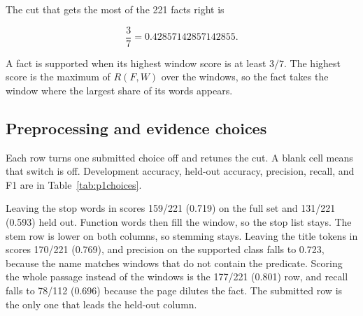 The cut that gets the most of the 221 facts right is

\[
\frac{3}{7} = 0.42857142857142855.
\]

A fact is supported when its highest window score is at least \(3/7\). The highest score is the maximum of \(R(F,W)\) over the windows, so the fact takes the window where the largest share of its words appears.

\subsection{Preprocessing and evidence choices}

Each row turns one submitted choice off and retunes the cut. A blank cell means that switch is off. Development accuracy, held-out accuracy, precision, recall, and F1 are in Table~\ref{tab:p1choices}.

Leaving the stop words in scores 159/221 (0.719) on the full set and 131/221 (0.593) held out. Function words then fill the window, so the stop list stays. The stem row is lower on both columns, so stemming stays. Leaving the title tokens in scores 170/221 (0.769), and precision on the supported class falls to 0.723, because the name matches windows that do not contain the predicate. Scoring the whole passage instead of the windows is the 177/221 (0.801) row, and recall falls to 78/112 (0.696) because the page dilutes the fact. The submitted row is the only one that leads the held-out column.

\begin{table}[H]
\centering
\caption{Part 1 choices}
\label{tab:p1choices}
{\footnotesize
{}
}
\end{table}

